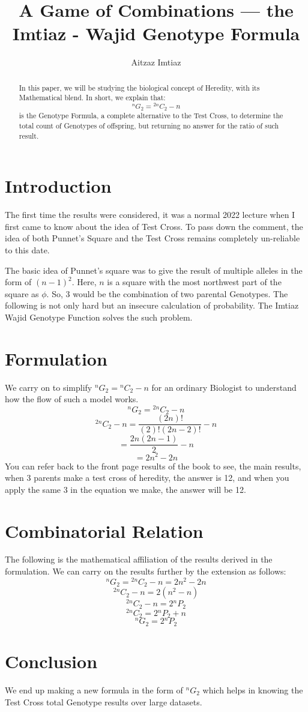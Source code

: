 \documentclass[11pt]{article}
\theoremstyle{plain}
\theoremstyle{definition}
\begin{document}
\title{A Game of Combinations --- the Imtiaz - Wajid Genotype Formula}
\author{Aitzaz Imtiaz}
\date{}
\maketitle


\begin{abstract}
 In this paper, we will be studying the biological concept of Heredity, with its Mathematical blend. In short, we explain that:
 $$
 {}^{n}G_{2}={}^{2n}C_{2}-n
 $$
 is the Genotype Formula, a complete alternative to the Test Cross, to determine the total count of Genotypes of offspring, but returning no answer for the ratio of such result.
\end{abstract}
\section{Introduction}
The first time the results were considered, it was a normal 2022 lecture \cite{1} when I first came to know about the idea of Test Cross. To pass down the comment, the idea of both Punnet's Square and the Test Cross remains completely un-reliable to this date. 

The basic idea of Punnet's square was to give the result of multiple alleles in the form of $(n-1)^2$.  Here, $n$ is a square with the most northwest part of the square as $\phi$. So, 3 would be the combination of two parental Genotypes. The following is not only hard but an insecure calculation of probability. The Imtiaz Wajid Genotype Function solves the such problem.
\section{Formulation}
We carry on to simplify $ {}^{n}G_{2}={}^{n}C_{2}-n$ for an ordinary Biologist to understand how the flow of such a model works.
$$
{}^{n}G_{2}={}^{2n}C_{2}-n
$$
$$
{}^{2n}C_{2}-n = \frac{(2n)!}{(2)!(2n-2)!}-n
$$
$$
=\frac{2n(2n-1)}{2}-n
$$
$$
=2n^2-2n
$$
You can refer back to the front page results of the book\cite{1} to see, the main results, when 3 parents make a test cross of heredity, the answer is 12, and when you apply the same 3 in the equation we make, the answer will be 12.
\section{Combinatorial Relation}
The following is the mathematical affiliation of the results derived in the formulation. We can carry on the results further by the extension as follows:
\newline
$$
{}^{n}G_{2}={}^{2n}C_{2}-n=2n^2-2n
$$
$$
{}^{2n}C_{2}-n=2(n^2-n)
$$
$$
{}^{2n}C_{2}-n=2{}^{n}P_{2}
$$
$$
{}^{2n}C_{2}=2{}^{n}P_{2}+n
$$
$$
{}^{n}G_{2}=2{}^{n}P_{2}
$$
\section{Conclusion}
We end up making a new formula in the form of ${}^{n}G_{2}$ which helps in knowing the Test Cross total Genotype results over large datasets.
\begin{footnotesize}


\end{footnotesize}
\end{document}
